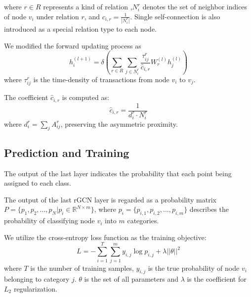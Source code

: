 where $r \in R$ represents a kind of relation ,$N_i^r$ denotes the set of neighbor indices of node $v_i$ under relation $r$, and $c_{i,r}=\frac{1}{|N_i^r|}$. Single self-connection is also introduced as a special relation type to each node. %

We modified the forward updating process as 
\begin{equation}
h_i^{(l+1)}=\delta(\sum_{r\in R} \sum_{j \in N_i^r} \frac{\tau_{ij}^r}{\hat c_{i,r}}W_r^{(l)}h_j^{(l)})
\end{equation}
where $\tau_{ij}^r$ is the time-density of transactions from node $v_i$ to $v_j$. 

The coefficient $\hat c_{i,r}$ is computed as:
\begin{equation}
\hat c_{i,r}=\frac{1}{d_i^r\cdot N_i^r}
\end{equation}
where $d_i^r=\sum_{j}A^r_{ij}$, preserving the asymmetric proximity.


\subsection{Prediction and Training}
The output of the last layer indicates the probability that each point being assigned to each class.

The output of the last rGCN layer is regarded as a probability matrix $P=\{p_1,p_2,...,p_N|p_i\in \mathbb{R}^{N \times m}\}$, where $p_i=\{p_{i,1},p_{i,2},...,p_{i,m}\}$ describes the probability of classifying node $v_i$ into $m$ categories. 

We utilize the cross-entropy loss function as the training objective:
\begin{equation}
L=-\sum_{i=1}^T\sum_{j=1}^m y_{i,j}\log p_{i,j}+\lambda ||\theta||^2
\end{equation}
where $T$ is the number of training samples, $y_{i,j}$ is the true probability of node $v_i$ belonging to category $j$. $\theta$ is the set of all parameters and $\lambda$ is the coefficient for $L_2$  regularization.
